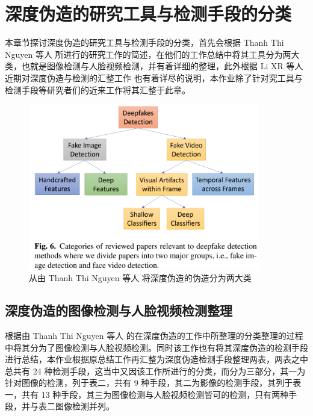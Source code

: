 \chapter{深度伪造的研究工具与检测手段的分类}
\label{chap:3}

本章节探讨深度伪造的研究工具与检测手段的分类，首先会根据 Thanh Thi Nguyen 等人 \cite{https://doi.org/10.48550/arxiv.1909.11573} 所进行的研究工作的简述，在他们的工作总结中将其工具分为两大类，也就是图像检测与人脸视频检测，并有着详细的整理，此外根据 Li XR 等人近期对深度伪造与检测的汇整工作\cite{2021496} 也有着详尽的说明，本作业除了针对究工具与检测手段等研究者们的近来工作将其汇整于此章。

\begin{figure}[htb]
\centering 
\includegraphics[width=0.90\textwidth]{img/ch3m1.png} 
\caption{从由 Thanh Thi Nguyen 等人 \cite{https://doi.org/10.48550/arxiv.1909.11573} 将深度伪造的伪造分为两大类}
\label{Test}
\end{figure}


\section{深度伪造的图像检测与人脸视频检测整理}

根据由 Thanh Thi Nguyen 等人 \cite{https://doi.org/10.48550/arxiv.1909.11573}的在深度伪造的工作中所整理的分类整理的过程中将其分为了图像检测与人脸视频检测。同时该工作也有将其深度伪造的检测手段进行总结，本作业根据原总结工作再汇整为深度伪造检测手段整理两表，两表之中总共有 24 种检测手段，这当中又因该工作所进行的分类，而分为三部分，其一为针对图像的检测，列于表二，共有 9 种手段，其二为影像的检测手段，其列于表一，共有 13 种手段，其三为图像检测与人脸视频检测皆可的检测，只有两种手段，并与表二图像检测并列。



